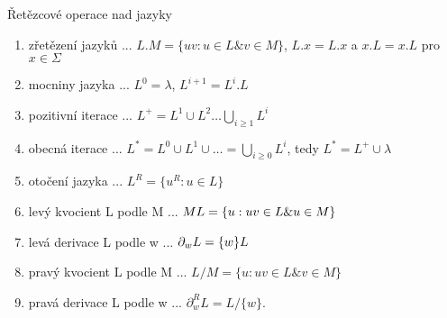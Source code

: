\documentclass[../main.tex]{subfiles}
\begin{document}
\begin{definition}
    Řetězcové operace nad jazyky

    \begin{enumerate}
        \item zřetězení jazyků ... $L.M = \{uv : u \in L \& v \in M\}$, $L.x = L.{x}$ a $x.L = {x}.L$ pro $x \in \Sigma$
        \item mocniny jazyka ... $L^0 = {\lambda}$, $L^{i+1} = L^i.L$
        \item pozitivní iterace ... $L^+ = L^1 \cup L^2 \dots \bigcup_{i\geq 1} L^i$
        \item obecná iterace ... $L^* = L^0 \cup L^1 \cup \dots = \bigcup_{i\geq 0}L^i$, tedy $L^* = L^+ \cup {\lambda}$
        \item otočení jazyka ... $L^R = \{u^R : u\in L\}$
        \item levý kvocient L podle M ... $M\\L = \{u : uv \in L \& u\in M\}$
        \item levá derivace L podle w ... $\partial_wL = \{w\}\\ L$
        \item pravý kvocient L podle M ... $L/M = \{u: uv \in L \& v \in M\}$
        \item pravá derivace L podle w ... $\partial^R_wL=L/\{w\}$.
    \end{enumerate}
\end{definition}
\end{document}
